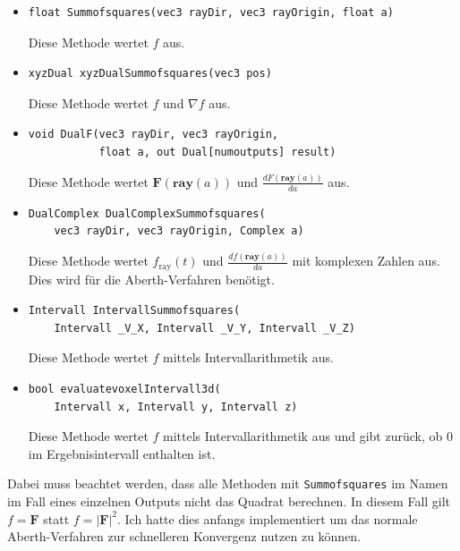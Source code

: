 \documentclass[
	ngerman,%
	accentcolor=9c,%
	ruledheaders=section,%
	class=report,%
	thesis={type=bachelor},%
	fontsize=11pt,%
	parskip=half-,%
	custommargins=true,%
	marginpar=false,%
]{tudapub}
\begin{document}
\begin{itemize}

\item
\begin{verbatim}
float Summofsquares(vec3 rayDir, vec3 rayOrigin, float a)
\end{verbatim}
Diese Methode wertet \(f\) aus.

\item
\begin{verbatim}
xyzDual xyzDualSummofsquares(vec3 pos)
\end{verbatim}
Diese Methode wertet \(f\) und \(\nabla f\) aus.

\item
\begin{verbatim}
void DualF(vec3 rayDir, vec3 rayOrigin,
           float a, out Dual[numoutputs] result)
\end{verbatim}
Diese Methode wertet \(\mathbf{F}(\mathbf{ray}(a))\) und
\(\frac{dF(\mathbf{ray}(a))}{da}\) aus.

\item
\begin{verbatim}
DualComplex DualComplexSummofsquares(
    vec3 rayDir, vec3 rayOrigin, Complex a)
\end{verbatim}
Diese Methode wertet \( f_{\text{ray}}(t) \) und
\(\frac{df(\mathbf{ray}(a))}{da}\) mit komplexen Zahlen aus.
Dies wird für die Aberth-Verfahren benötigt.

\item
\begin{verbatim}
Intervall IntervallSummofsquares(
    Intervall _V_X, Intervall _V_Y, Intervall _V_Z)
\end{verbatim}
Diese Methode wertet \(f\) mittels Intervallarithmetik aus.

\item
\begin{verbatim}
bool evaluatevoxelIntervall3d(
    Intervall x, Intervall y, Intervall z)
\end{verbatim}
Diese Methode wertet \(f\) mittels Intervallarithmetik aus und
gibt zurück, ob \(0\) im Ergebnisintervall enthalten ist.

\end{itemize}

Dabei muss beachtet werden, dass alle Methoden mit
\texttt{Summofsquares} im Namen im Fall eines einzelnen Outputs
nicht das Quadrat berechnen. In diesem Fall gilt \(f =  \mathbf{F}\) statt \(f = |\mathbf{F}|^2\).
Ich hatte dies anfangs implementiert um das normale Aberth-Verfahren zur schnelleren Konvergenz nutzen zu können.
\end{document}
